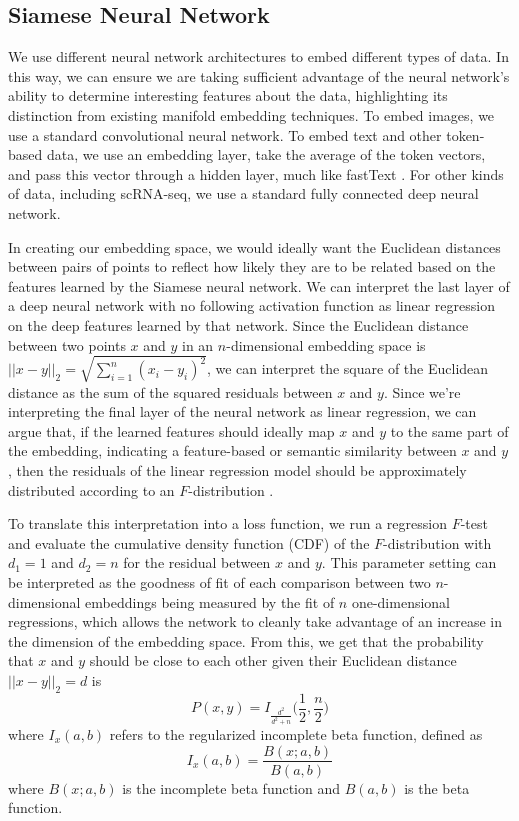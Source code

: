 \documentclass{article}
\begin{document}
\subsection{Siamese Neural Network}



We use different neural network architectures to embed different types of data. In this way, we can ensure we are taking sufficient advantage of the neural network's ability to determine interesting features about the data, highlighting its distinction from existing manifold embedding techniques. To embed images, we use a standard convolutional neural network. To embed text and other token-based data, we use an embedding layer, take the average of the token vectors, and pass this vector through a hidden layer, much like fastText \cite{joulin2016bag}. For other kinds of data, including scRNA-seq, we use a standard fully connected deep neural network.

In creating our embedding space, we would ideally want the Euclidean distances between pairs of points to reflect how likely they are to be related based on the features learned by the Siamese neural network. We can interpret the last layer of a deep neural network with no following activation function as linear regression on the deep features learned by that network. Since the Euclidean distance between two points $x$ and $y$ in an $n$-dimensional embedding space is $||x - y||_2 = \sqrt{\sum_{i=1}^n (x_i-y_i)^2}$, we can interpret the square of the Euclidean distance as the sum of the squared residuals between $x$ and $y$. Since we're interpreting the final layer of the neural network as linear regression, we can argue that, if the learned features should ideally map $x$ and $y$ to the same part of the embedding, indicating a feature-based or semantic similarity between $x$ and $y$, then the residuals of the linear regression model should be approximately distributed according to an $F$-distribution \cite{ramsey1969tests}. 

To translate this interpretation into a loss function, we run a regression $F$-test and evaluate the cumulative density function (CDF) of the $F$-distribution with $d_1 = 1$ and $d_2 = n$ for the residual between $x$ and $y$. This parameter setting can be interpreted as the goodness of fit of each comparison between two $n$-dimensional embeddings being measured by the fit of $n$ one-dimensional regressions, which allows the network to cleanly take advantage of an increase in the dimension of the embedding space. From this, we get that the probability that $x$ and $y$ should be close to each other given their Euclidean distance $||x-y||_2 = d$ is 
    \[ P(x, y) = I_{\frac{d^2}{d^2 + n}}\bigg(\frac{1}{2}, \frac{n}{2}\bigg) \]
where $I_x(a, b)$ refers to the regularized incomplete beta function, defined as 
    \[ I_x(a, b) = \frac{B(x; a, b)}{B(a, b)}  \]
where $B(x; a, b)$ is the incomplete beta function and $B(a, b)$ is the beta function.
\end{document}
